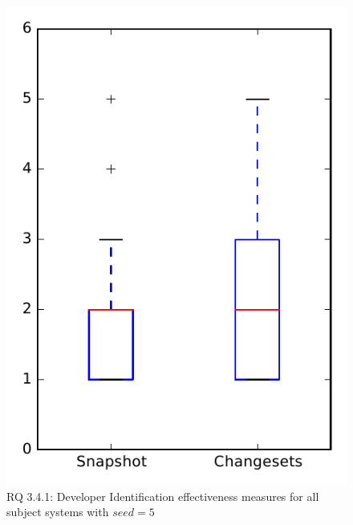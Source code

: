 
\begin{figure}
\centering
\includegraphics[height=0.4\textheight]{figures/dit_seed/rq1_overview_5}
\caption{RQ 3.4.1: Developer Identification effectiveness measures for all subject systems with $seed=5$}
\label{fig:dit_seed:rq1:overview}
\end{figure}
